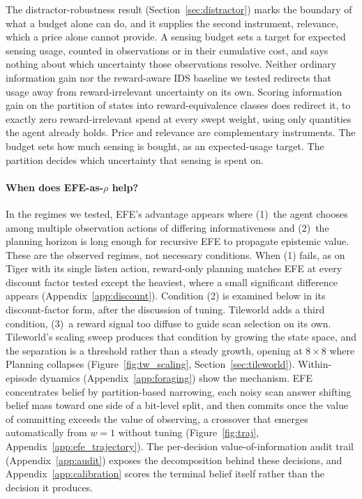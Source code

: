 The distractor-robustness result (Section~\ref{sec:distractor}) marks the boundary of what a budget alone can do, and it supplies the second instrument, relevance, which a price alone cannot provide. A sensing budget sets a target for expected sensing usage, counted in observations or in their cumulative cost, and says nothing about which uncertainty those observations resolve. Neither ordinary information gain nor the reward-aware IDS baseline we tested redirects that usage away from reward-irrelevant uncertainty on its own. Scoring information gain on the partition of states into reward-equivalence classes does redirect it, to exactly zero reward-irrelevant spend at every swept weight, using only quantities the agent already holds. Price and relevance are complementary instruments. The budget sets how much sensing is bought, as an expected-usage target. The partition decides which uncertainty that sensing is spent on.

\paragraph{When does EFE-as-$\rho$ help?}
In the regimes we tested, EFE's advantage appears where (1)~the agent chooses among multiple observation actions of differing informativeness and (2)~the planning horizon is long enough for recursive EFE to propagate epistemic value. These are the observed regimes, not necessary conditions. When (1) fails, as on Tiger with its single listen action, reward-only planning matches EFE at every discount factor tested except the heaviest, where a small significant difference appears (Appendix~\ref{app:discount}). Condition (2) is examined below in its discount-factor form, after the discussion of tuning. Tileworld adds a third condition, (3)~a reward signal too diffuse to guide scan selection on its own. Tileworld's scaling sweep produces that condition by growing the state space, and the separation is a threshold rather than a steady growth, opening at $8{\times}8$ where Planning collapses (Figure~\ref{fig:tw_scaling}, Section~\ref{sec:tileworld}). Within-episode dynamics (Appendix~\ref{app:foraging}) show the mechanism. EFE concentrates belief by partition-based narrowing, each noisy scan answer shifting belief mass toward one side of a bit-level split, and then commits once the value of committing exceeds the value of observing, a crossover that emerges automatically from $w{=}1$ without tuning (Figure~\ref{fig:traj}, Appendix~\ref{app:efe_trajectory}). The per-decision value-of-information audit trail (Appendix~\ref{app:audit}) exposes the decomposition behind these decisions, and Appendix~\ref{app:calibration} scores the terminal belief itself rather than the decision it produces.

